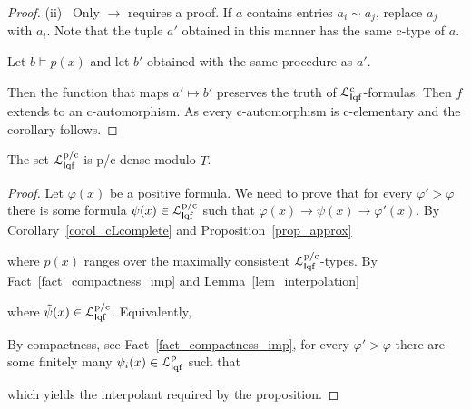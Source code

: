 \documentclass{amsproc}
\begin{document}
{\begin{proof}
  (ii) \ 
  Only $\rightarrow$ requires a proof.
  If $a$ contains entries $a_i\sim a_j$, replace $a_j$ with $a_i$.
  Note that the tuple $a'$ obtained in this manner has the same c-type of $a$.
 
  Let $b\models p(x)$ and let $b'$ obtained with the same procedure as $a'$.
  
  Then the function that maps $a'\mapsto b'$ preserves the truth of ${\EuScript L}^{\rm c}_{{\sf I}{\rm qf}}$-formulas.
  Then $f$ extends to an c-automorphism.
  As every c-automorphism is c-elementary and the corollary follows.
\end{proof}

\begin{proposition}\label{prop_cLHapprox1}
  The set ${\EuScript L}^{\rm p/c}_{{\sf I}{\rm qf}}$ is p/c-dense modulo $T$.
\end{proposition}

\begin{proof}
  Let $\varphi(x)$ be a positive formula.
  We need to prove that for every $\varphi'>\varphi$ there is some formula $\psi(x)\in{\EuScript L}^{\rm p/c}_{{\sf I}{\rm qf}}$ such that $\varphi(x)\rightarrow\psi(x)\rightarrow\varphi'(x)$.
  By Corollary~\ref{corol_cLcomplete} and Proposition~\ref{prop_approx}


  where $p(x)$ ranges over the maximally consistent ${\EuScript L}^{\rm p/c}_{{\sf I}{\rm qf}}$-types.
  By Fact~\ref{fact_compactness_imp} and Lemma~\ref{lem_interpolation}


  where $\tilde{\psi}(x)\in{\EuScript L}^{\rm p/c}_{{\sf I}{\rm qf}}$.
  Equivalently,


  By compactness, see Fact~\ref{fact_compactness_imp}, for every $\varphi'>\varphi$ there are some finitely many $\tilde{\psi}_i(x)\in{\EuScript L}^{\rm p}_{{\sf I}{\rm qf}}$ such that


  which yields the interpolant required by the proposition.
\end{proof}

}
\end{document}
